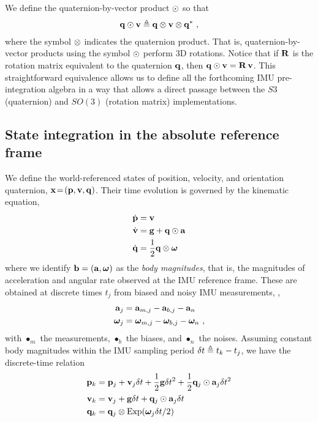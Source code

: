 We define the quaternion-by-vector product $\odot$ so that
%
\begin{align}
{\bf q}\odot{\bf v} \triangleq {\bf q}\otimes{\bf v}\otimes{\bf q}^*
~,
\end{align}
%
where the symbol $\otimes$ indicates the quaternion product.
That is, quaternion-by-vector products using the symbol $\odot$ perform 3D rotations. 
Notice that if ${\bf R}$ is the rotation matrix equivalent to the quaternion ${\bf q}$, then 
%
${\bf q}\odot{\bf v} = {\bf R}\,{\bf v}$. 
%
This straightforward equivalence
allows us to define all the forthcoming IMU pre-integration algebra in a way that allows a direct passage between the $S3$ (quaternion) and $SO(3)$ (rotation matrix) implementations.





\subsection{State integration in the absolute reference frame}

We define the world-referenced states of position, velocity, and orientation quaternion, ${\bf x}\!=\!({\bf p},{\bf v},{\bf q})$. 
Their time evolution is governed by the kinematic equation,
%
\begin{align}\label{equ:cont_basic}
\begin{split}
\dot{{\bf p}} &= {\bf v} \\
\dot{{\bf v}} &= {\bf g} + {\bf q}\odot{\bf a} \\
\dot{{\bf q}} &= \frac12{\bf q}\otimes{{\bm \omega}} 
\end{split}
\end{align}
%
where we identify ${\bf b}=({\bf a},{{\bm \omega}})$ as the \emph{body magnitudes}, that is, the magnitudes of acceleration and angular rate observed at the IMU reference frame. These are obtained at discrete times $t_j$ from biased and noisy IMU measurements, \ie,
%
\begin{align}\label{equ:body}
\begin{split}
{\bf a}_j &= {\bf a}_{m,j} - {\bf a}_{b,j} - {\bf a}_n \\
{{\bm \omega}}_j  &= {{\bm \omega}}_{m,j}  - {{\bm \omega}}_{b,j}  - {{\bm \omega}}_n 
~,
\end{split}
\end{align}
%
with $\bullet_m$ the measurements, $\bullet_b$ the biases, and $\bullet_n$ the noises.
Assuming constant body magnitudes within the IMU sampling period $\delta t\triangleq t_k-t_j$, we have the discrete-time relation
%
\begin{align}\label{equ:integration_state}
\begin{split}
{\bf p}_{k} &= {\bf p}_j + {\bf v}_j\delta t  + \frac12{\bf g}\delta t^2 + \frac12{\bf q}_j\odot{\bf a}_j\delta t^2 \\
{\bf v}_{k} &= {\bf v}_j + {\bf g}\delta t + {\bf q}_j\odot{\bf a}_j\delta t \\
{\bf q}_{k} &= {\bf q}_j\otimes\operatorname*{Exp}({{\bm \omega}}_j\delta t/2) 
\end{split}
\end{align}


